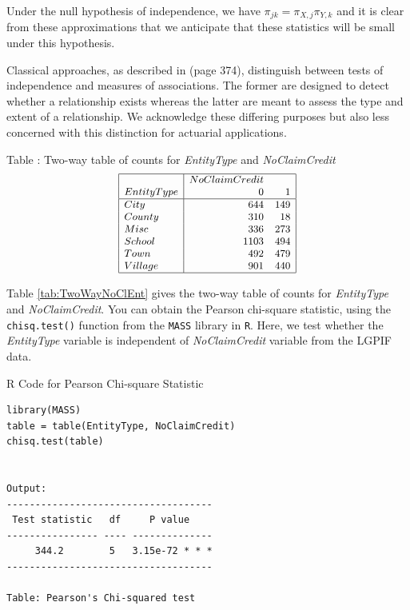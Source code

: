 \documentclass[]{book}
\theoremstyle{definition}
\theoremstyle{definition}
\theoremstyle{definition}
\theoremstyle{remark}
\begin{document}
Under the null hypothesis of independence, we have
\(\pi_{jk} =\pi_{X,j}\pi_{Y,k}\) and it is clear from these
approximations that we anticipate that these statistics will be small
under this hypothesis.

Classical approaches, as described in \citep{bishop1975discrete} (page
374), distinguish between tests of independence and measures of
associations. The former are designed to detect whether a relationship
exists whereas the latter are meant to assess the type and extent of a
relationship. We acknowledge these differing purposes but also less
concerned with this distinction for actuarial applications.

Table : \label{tab:TwoWayNoClEnt} Two-way table of counts for
\emph{EntityType} and \emph{NoClaimCredit} \[
{\small \begin{matrix}
\begin{array}{|l|rr|} 
    \hline
                  & NoClaimCredit &  \\
       EntityType & 0     & 1      \\
  \hline
            City    & 644  & 149 \\
          County    & 310  &  18 \\
            Misc    & 336  & 273 \\
          School    & 1103 & 494 \\
           Town     & 492  & 479 \\
         Village    & 901  & 440 \\
   \hline
\end{array}
\end{matrix}}
\]

Table \ref{tab:TwoWayNoClEnt} gives the two-way table of counts for
\emph{EntityType} and \emph{NoClaimCredit}. You can obtain the Pearson
chi-square statistic, using the \texttt{chisq.test()} function from the
\texttt{MASS} library in \texttt{R}. Here, we test whether the
\emph{EntityType} variable is independent of \emph{NoClaimCredit}
variable from the LGPIF data.

R Code for Pearson Chi-square Statistic

\hypertarget{display.chi.2}{}
\begin{verbatim}
library(MASS)
table = table(EntityType, NoClaimCredit)
chisq.test(table)


Output:
------------------------------------
 Test statistic   df     P value    
---------------- ---- --------------
     344.2        5   3.15e-72 * * *
------------------------------------

Table: Pearson's Chi-squared test
\end{verbatim}
\end{document}
